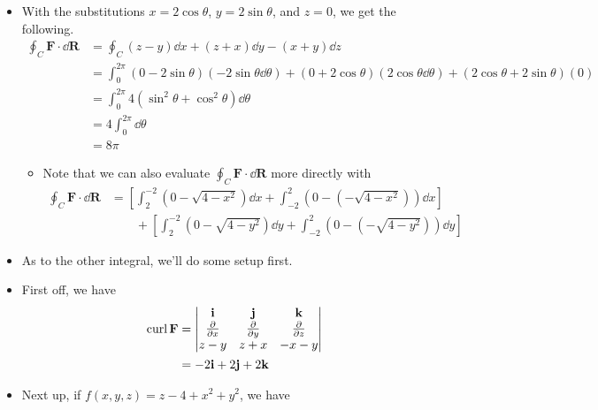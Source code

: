 \documentclass[../main.tex]{subfiles}
\begin{document}
\begin{itemize}
\begin{itemize}
        \item With the substitutions $x=2\cos\theta$, $y=2\sin\theta$, and $z=0$, we get the following.
        \begin{align*}
            \oint_C\mathbf{F}\cdot\dd{\mathbf{R}} &= \oint_C(z-y)\dd{x}+(z+x)\dd{y}-(x+y)\dd{z}\\
            &= \int_0^{2\pi}(0-2\sin\theta)(-2\sin\theta\dd{\theta})+(0+2\cos\theta)(2\cos\theta\dd{\theta})+(2\cos\theta+2\sin\theta)(0)\\
            &= \int_0^{2\pi}4(\sin^2\theta+\cos^2\theta)\dd{\theta}\\
            &= 4\int_0^{2\pi}\dd{\theta}\\
            &= 8\pi
        \end{align*}
        \begin{itemize}
            \item Note that we can also evaluate $\oint_C\mathbf{F}\cdot\dd{\mathbf{R}}$ more directly with
            \begin{equation*}
                \begin{split}
                    \oint_C\mathbf{F}\cdot\dd{\mathbf{R}} &= \left[ \int_2^{-2}\left( 0-\sqrt{4-x^2} \right)\dd{x}+\int_{-2}^2\left( 0-\left( -\sqrt{4-x^2} \right) \right)\dd{x} \right]\\
                    &\qquad+\left[ \int_2^{-2}\left( 0-\sqrt{4-y^2} \right)\dd{y}+\int_{-2}^2\left( 0-\left( -\sqrt{4-y^2} \right) \right)\dd{y} \right]
                \end{split}
            \end{equation*}
        \end{itemize}
        \item As to the other integral, we'll do some setup first.
        \item First off, we have
        \begin{align*}
            \text{curl}\,\mathbf{F} &=
            \begin{vmatrix}
                \mathbf{i} & \mathbf{j} & \mathbf{k}\\
                \pdv{x} & \pdv{y} & \pdv{z}\\
                z-y & z+x & -x-y\\
            \end{vmatrix}\\
            &= -2\mathbf{i}+2\mathbf{j}+2\mathbf{k}
        \end{align*}
        \item Next up, if $f(x,y,z)=z-4+x^2+y^2$, we have

\end{itemize}
\end{itemize}
\end{document}
